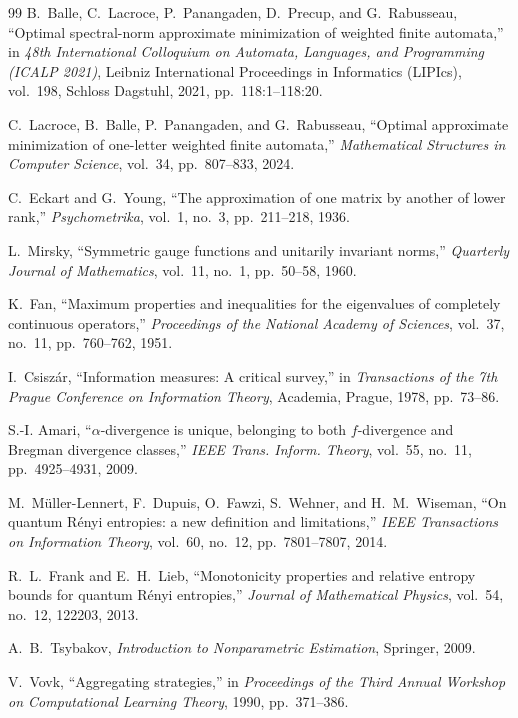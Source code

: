 \documentclass[12pt]{article}
\theoremstyle{definition}
\begin{document}
\begin{thebibliography}{99}
B.~Balle, C.~Lacroce, P.~Panangaden, D.~Precup, and G.~Rabusseau,
``Optimal spectral-norm approximate minimization of weighted finite automata,''
in \emph{48th International Colloquium on Automata, Languages, and
Programming (ICALP 2021)}, Leibniz International Proceedings in Informatics
(LIPIcs), vol.~198, Schloss Dagstuhl, 2021, pp.~118:1--118:20.

C.~Lacroce, B.~Balle, P.~Panangaden, and G.~Rabusseau,
``Optimal approximate minimization of one-letter weighted finite automata,''
\emph{Mathematical Structures in Computer Science}, vol.~34, pp.~807--833,
2024.

C.~Eckart and G.~Young,
``The approximation of one matrix by another of lower rank,''
\emph{Psychometrika}, vol.~1, no.~3, pp.~211--218, 1936.

L.~Mirsky,
``Symmetric gauge functions and unitarily invariant norms,''
\emph{Quarterly Journal of Mathematics}, vol.~11, no.~1, pp.~50--58, 1960.

K.~Fan,
``Maximum properties and inequalities for the eigenvalues of completely
continuous operators,''
\emph{Proceedings of the National Academy of Sciences},
vol.~37, no.~11, pp.~760--762, 1951.

I.~Csisz\'ar,
``Information measures: A critical survey,''
in \emph{Transactions of the 7th Prague Conference on Information Theory},
Academia, Prague, 1978, pp.~73--86.

S.-I. Amari,
``$\alpha$-divergence is unique, belonging to both $f$-divergence and
Bregman divergence classes,''
\emph{IEEE Trans. Inform. Theory}, vol.~55, no.~11, pp.~4925--4931, 2009.

M.~M\"uller-Lennert, F.~Dupuis, O.~Fawzi, S.~Wehner, and H.~M.~Wiseman,
``On quantum R\'enyi entropies: a new definition and limitations,''
\emph{IEEE Transactions on Information Theory}, vol.~60, no.~12,
pp.~7801--7807, 2014.

R.~L.~Frank and E.~H.~Lieb,
``Monotonicity properties and relative entropy bounds for quantum
R\'enyi entropies,''
\emph{Journal of Mathematical Physics}, vol.~54, no.~12, 122203, 2013.

A.~B.~Tsybakov,
\emph{Introduction to Nonparametric Estimation},
Springer, 2009.

V.~Vovk,
``Aggregating strategies,''
in \emph{Proceedings of the Third Annual Workshop on Computational Learning
Theory}, 1990, pp.~371--386.


\end{thebibliography}
\end{document}

